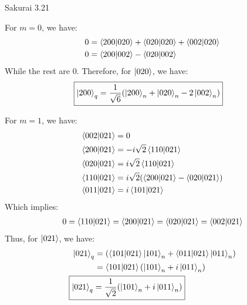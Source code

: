 \documentclass{article}
\begin{document}
\begin{section}{Sakurai 3.21}
\begin{enumerate}
\begin{tcolorbox}[breakable]
		For $m=0$, we have:
		\begin{align*}
			0 & = \bra{200}\ket{020} + \bra{020}\ket{020} + \bra{002}\ket{020} \\
			0 & = \bra{200}\ket{002} - \bra{020}\ket{002}
		\end{align*}
		While the rest are 0. Therefore, for $\ket{020}$, we have:
		\begin{align*}
			\Aboxed{\ket{200}_q & = \frac{1}{\sqrt{6}} (\ket{200}_n + \ket{020}_n - 2\ket{002}_n)}
		\end{align*}

		For $m=1$, we have:
		\begin{align*}
			\bra{002}\ket{021} & = 0                                                  \\
			\bra{200}\ket{021} & = -i\sqrt{2}\bra{110}\ket{021}                       \\
			\bra{020}\ket{021} & = i\sqrt{2}\bra{110}\ket{021}                        \\
			\bra{110}\ket{021} & = i\sqrt{2}(\bra{200}\ket{021} - \bra{020}\ket{021}) \\
			\bra{011}\ket{021} & = i \bra{101}\ket{021}
		\end{align*}
		Which implies:
		\begin{align*}
			0 = \bra{110}\ket{021} = \bra{200}\ket{021} = \bra{020}\ket{021} = \bra{002}\ket{021}
		\end{align*}
		Thus, for $\ket{021}$, we have:
		\begin{align*}
			\ket{021}_q         & = (\bra{101}\ket{021} \ket{101}_n + \bra{011}\ket{021} \ket{011}_n) \\
			                    & = \bra{101}\ket{021} ( \ket{101}_n + i \ket{011}_n)                 \\
			\Aboxed{\ket{021}_q & = \frac{1}{\sqrt{2}} (\ket{101}_n + i \ket{011}_n)}
		\end{align*}


\end{tcolorbox}
\end{enumerate}
\end{section}
\end{document}
